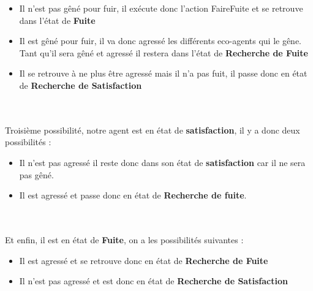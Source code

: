 \begin{itemize}
\item Il n'est pas gêné pour fuir, il exécute donc l'action FaireFuite et se retrouve dans l'état de \textbf{Fuite}
\item Il est gêné pour fuir, il va donc agressé les différents eco-agents qui le gêne. Tant qu'il sera gêné et agressé il restera dans l'état de \textbf{Recherche de Fuite}
\item Il se retrouve à ne plus être agressé mais il n'a pas fuit, il passe donc en état de \textbf{Recherche de Satisfaction} 
\end{itemize}~\\
~\\
Troisième possibilité, notre agent est en état de \textbf{satisfaction}, il y a donc deux possibilités :\\
\begin{itemize}
\item Il n'est pas agressé il reste donc dans son état de \textbf{satisfaction} car il ne sera pas gêné.
\item Il est agressé et passe donc en état de \textbf{Recherche de fuite}. 
\end{itemize}~\\
~\\
Et enfin, il est en état de \textbf{Fuite}, on a les possibilités suivantes :\\
\begin{itemize}
\item Il est agressé et se retrouve donc en état de \textbf{Recherche de Fuite}
\item Il n'est pas agressé et est donc en état de \textbf{Recherche de Satisfaction}
\end{itemize}
